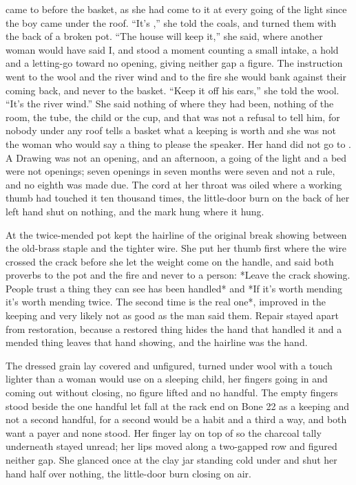  came to  before the basket, as she had come to it at every going of the light since the boy came under the roof. “It's ,” she told the coals, and turned them with the back of a broken pot. “The house will keep it,” she said, where another woman would have said I, and stood a moment counting a small intake, a hold and a letting-go toward no opening, giving neither gap a figure. The instruction went to the wool and the river wind and to the fire she would bank against their coming back, and never to the basket. “Keep it off his ears,” she told the wool. “It's the river wind.” She said nothing of where they had been, nothing of the room, the tube, the child or the cup, and that was not a refusal to tell him, for nobody under any roof tells a basket what a keeping is worth and she was not the woman who would say a thing to please the speaker. Her hand did not go to . A Drawing was not an opening, and an afternoon, a going of the light and a bed were not openings; seven openings in seven months were seven and not a rule, and no eighth was made due. The cord at her throat was oiled where a working thumb had touched it ten thousand times, the little-door burn on the back of her left hand shut on nothing, and the mark hung where it hung.

\scenebreak

At  the twice-mended pot kept the hairline of the original break showing between the old-brass staple and the tighter wire. She put her thumb first where the wire crossed the crack before she let the weight come on the handle, and said both proverbs to the pot and the fire and never to a person: *Leave the crack showing. People trust a thing they can see has been handled* and *If it's worth mending it's worth mending twice. The second time is the real one*, improved in the keeping and very likely not as good as the man said them. Repair stayed apart from restoration, because a restored thing hides the hand that handled it and a mended thing leaves that hand showing, and the hairline was the hand.

The dressed grain lay covered and unfigured, turned under wool with a touch lighter than a woman would use on a sleeping child, her fingers going in and coming out without closing, no figure lifted and no handful. The empty fingers stood beside the one handful let fall at the rack end on Bone 22 as a keeping and not a second handful, for a second would be a habit and a third a way, and both want a payer and none stood. Her finger lay on top of  so the charcoal tally underneath stayed unread; her lips moved along a two-gapped row and figured neither gap. She glanced once at the clay jar standing cold under  and shut her hand half over nothing, the little-door burn closing on air.

